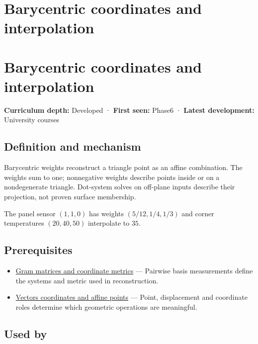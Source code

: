 \hypertarget{appendix-02b9d9a81dca}{}
\section*{Barycentric coordinates and interpolation}
\section{Barycentric coordinates and interpolation}\label{appendix-02b9d9a81dca-barycentric-coordinates-and-interpolation}

\textbf{Curriculum depth:} Developed · \textbf{First seen:} Phase6 · \textbf{Latest development:} University courses

\subsection{Definition and mechanism}\label{appendix-02b9d9a81dca-definition-and-mechanism}

Barycentric weights reconstruct a triangle point as an affine combination. The weights sum to one; nonnegative weights describe points inside or on a nondegenerate triangle. Dot-system solves on off-plane inputs describe their projection, not proven surface membership.

The panel sensor \((1,1,0)\) has weights \((5/12,1/4,1/3)\) and corner temperatures \((20,40,50)\) interpolate to \(35\).

\subsection{Prerequisites}\label{appendix-02b9d9a81dca-prerequisites}

\begin{itemize}
\tightlist
\item
  \hyperref[appendix-3b863809f82a]{Gram matrices and coordinate metrics} --- Pairwise basis measurements define the systems and metric used in reconstruction.
\item
  \hyperref[appendix-0659864c0aa3]{Vectors coordinates and affine points} --- Point, displacement and coordinate roles determine which geometric operations are meaningful.
\end{itemize}

\subsection{Used by}\label{appendix-02b9d9a81dca-used-by}

